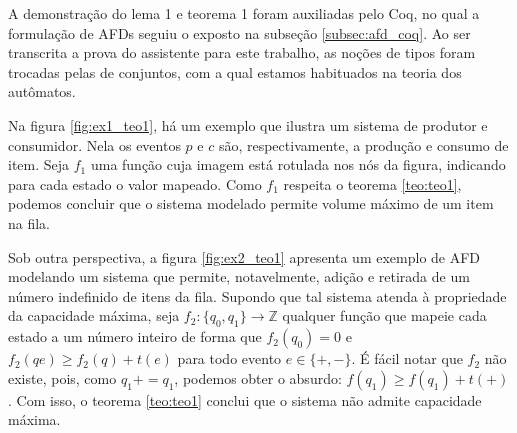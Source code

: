 A demonstração do lema 1 e teorema 1 foram auxiliadas pelo Coq, no qual a formulação de AFDs seguiu o exposto na subseção \ref{subsec:afd_coq}. Ao ser transcrita a prova do assistente para este trabalho, as noções de tipos foram trocadas pelas de conjuntos, com a qual estamos habituados na teoria dos autômatos.

Na figura \ref{fig:ex1_teo1}, há um exemplo que ilustra um sistema de produtor e consumidor. Nela os eventos $p$ e $c$ são, respectivamente, a produção e consumo de item. Seja $f_1$ uma função cuja imagem está rotulada nos nós da figura, indicando para cada estado o valor mapeado. Como $f_1$ respeita o teorema \ref{teo:teo1}, podemos concluir que o sistema modelado permite volume máximo de um item na fila.


Sob outra perspectiva, a figura \ref{fig:ex2_teo1} apresenta um exemplo de AFD modelando um sistema que permite, notavelmente, adição e retirada de um número indefinido de itens da fila. Supondo que tal sistema atenda à propriedade da capacidade máxima, seja $f_2 : \{ q_0, q_1 \} \to \mathbb{Z}$ qualquer função que mapeie cada estado a um número inteiro de forma que $f_2(q_0) = 0$ e $f_2(qe) \geq f_2(q) + t(e)$ para todo evento $e \in \{+,-\}$. É fácil notar que $f_2$ não existe, pois, como $q_1+ = q_1$, podemos obter o absurdo: $f(q_1) \geq f(q_1) + t(+)$. Com isso, o teorema \ref{teo:teo1} conclui que o sistema não admite capacidade máxima.


